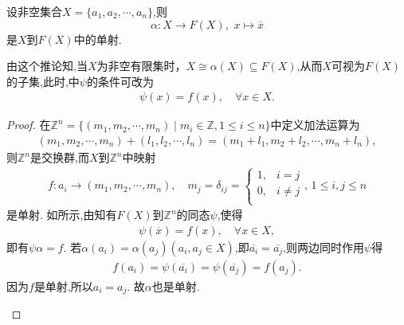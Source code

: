 \documentclass[../../main.tex]{subfiles}%
\begin{document}
\begin{corollary}\label{corollary:抽象代数--推论4.8.1}
设非空集合$X=\{a_1,a_2,\cdots,a_n\}$,则
$$
\alpha: X\to F(X),\,\,x\mapsto \overline{x}
$$
是$X$到$F(X)$中的单射.
\end{corollary}
\begin{remark}
由这个推论知,当$X$为非空有限集时，$X\cong \alpha(X)\subseteq F(X)$,从而$X$可视为$F(X)$的子集,此时,中$\psi$的条件可改为
\begin{align*}
\psi(x) = f(x),\quad \forall x\in X.
\end{align*}
\end{remark}
\begin{proof}

在$\mathbb{Z}^n = \{(m_1,m_2,\cdots,m_n)\mid m_i\in \mathbb{Z},1\leqslant i\leqslant n\}$中定义加法运算为
\begin{align*}
(m_1,m_2,\cdots,m_n)+(l_1,l_2,\cdots,l_n) = (m_1+l_1,m_2+l_2,\cdots,m_n+l_n),
\end{align*}
则$\mathbb{Z}^n$是交换群,而$X$到$\mathbb{Z}^n$中映射
\begin{align*}
f: a_i\to (m_1,m_2,\cdots,m_n),\quad m_j=\delta _{ij}=\begin{cases}
1,&i=j\\
0,&i\ne j\\
\end{cases},\,1\leqslant i,j\leqslant n
\end{align*}
是单射.
如所示,由知有$F(X)$到$\mathbb{Z}^n$的同态$\psi$,使得
\begin{align*}
\psi(\overline{x}) = f(x),\quad \forall x\in X,
\end{align*}
即有$\psi\alpha = f$. 若$\alpha \left( a_i \right) =\alpha \left( a_j \right) \left( a_i,a_j\in X \right) $,即$\overline{a_i}=\overline{a_j}$,则两边同时作用$\psi$得
\begin{align*}
f\left( a_i \right) =\psi \left( \overline{a_i} \right) =\psi \left( \overline{a_j} \right) =f\left( a_j \right) .
\end{align*}
因为$f$是单射,所以$a_i=a_j.$
故$\alpha$也是单射.
\begin{figure}[H]
\centering
\caption{}
\label{figure:抽代--交换图4.8.1}
\end{figure}
\end{proof}
\end{document}
